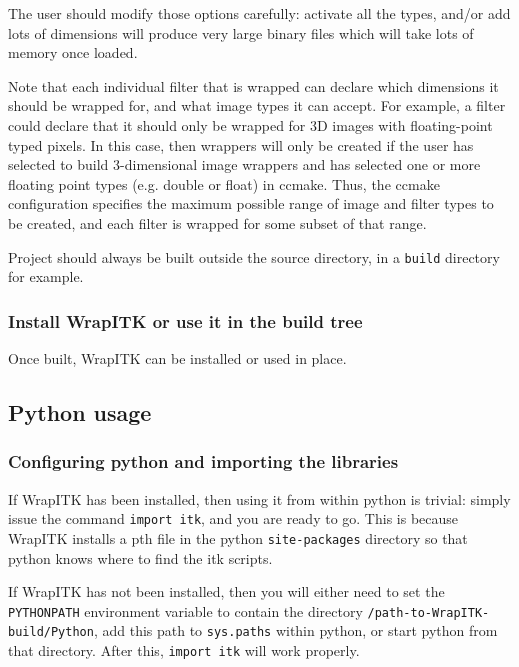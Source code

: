 \documentclass{InsightArticle}
\begin{document}
The user should modify those options carefully: activate all the types, and/or
add lots of dimensions will produce very large binary files which will take lots
of memory once loaded.

Note that each individual filter that is wrapped can declare which dimensions it
should be wrapped for, and what image types it can accept. For example, a filter
could declare that it should only be wrapped for 3D images with floating-point
typed pixels. In this case, then wrappers will only be created if the user has
selected to build 3-dimensional image wrappers and has selected one or more
floating point types (e.g. double or float) in ccmake. Thus, the ccmake
configuration specifies the maximum possible range of image and filter types to
be created, and each filter is wrapped for some subset of that range. 

Project should always be built outside the source directory, in a \verb$build$
directory for example.

    \subsubsection{Install WrapITK or use it in the build tree}

Once built, WrapITK can be installed or used in place.

  \subsection{Python usage}

     \subsubsection{Configuring python and importing the libraries}

If WrapITK has been installed, then using it from within python is trivial:
simply issue the command \verb$import itk$, and you are ready to go. This
is because WrapITK installs a pth file in the python \verb$site-packages$ directory so
that python knows where to find the itk scripts.

If WrapITK has not been installed, then you will either need to set the
\verb$PYTHONPATH$ environment variable to contain the directory
\verb$/path-to-WrapITK-build/Python$, add  this path to \verb$sys.paths$ within python, or
start python from that directory. After this, \verb$import itk$ will work
properly.
\end{document}
